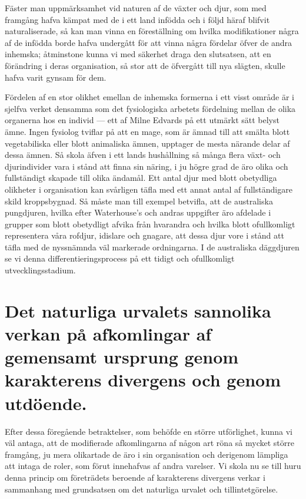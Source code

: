 Fäster man uppmärksamhet vid naturen af de växter och djur, som med framgång hafva kämpat med de i ett land infödda och i följd häraf blifvit naturaliserade, så kan man vinna en föreställning om hvilka modifikationer några af de infödda borde hafva undergått för att vinna några fördelar öfver de andra inhemska; åtminstone kunna vi med säkerhet draga den slutsatsen, att en förändring i deras organisation, så stor att de öfvergått till nya slägten, skulle hafva varit gynsam för dem.

Fördelen af en stor olikhet emellan de inhemska formerna i ett visst område är i sjelfva verket densamma som det fysiologiska arbetets fördelning mellan de olika organerna hos en individ — ett af Milne Edvards på ett utmärkt sätt belyst ämne. Ingen fysiolog tviflar på att en mage, som är ämnad till att smälta blott vegetabiliska eller blott animaliska ämnen, upptager de mesta närande delar af dessa ämnen. Så skola äfven i ett lands hushållning så många flera växt- och djurindivider vara i stånd att finna sin näring, i ju högre grad de äro olika och fullständigt skapade till olika ändamål. Ett antal djur med blott obetydliga olikheter i organisation kan svårligen täfla med ett annat antal af fullständigare skild kroppsbygnad. Så måste man till exempel betvifla, att de australiska pungdjuren, hvilka efter Waterhouse’s och andras uppgifter äro afdelade i grupper som blott obetydligt afvika från hvarandra och hvilka blott ofullkomligt representera våra rofdjur, idislare och gnagare, att dessa djur vore i stånd att täfla med de nyssnämnda väl markerade ordningarna. I de australiska däggdjuren se vi denna differentieringsprocess på ett tidigt och ofullkomligt utvecklingsstadium.



\section[Inverkan på afkomlingar]{Det naturliga urvalets sannolika verkan på
afkomlingar af gemensamt ursprung genom karakterens
divergens och genom utdöende.}

Efter dessa föregående betraktelser, som behöfde en större utförlighet, kunna vi väl antaga, att de modifierade afkomlingarna af någon art röna så mycket större framgång, ju mera olikartade de äro i sin organisation och derigenom lämpliga att intaga de roler, som förut innehafvas af andra varelser. Vi skola nu se till huru denna princip om företrädets beroende af karakterens divergens verkar i sammanhang med grundsatsen om det naturliga urvalet och tillintetgörelse.

